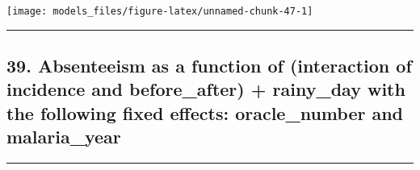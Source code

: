 \documentclass[]{article}
\begin{document}
\begin{center}\texttt{[image: models\_files/figure-latex/unnamed-chunk-47-1]} \end{center}

\newpage

\begin{center}\rule{0.5\linewidth}{\linethickness}\end{center}

\subsection{39. Absenteeism as a function of (interaction of incidence
and before\_after) + rainy\_day with the following fixed effects:
oracle\_number and
malaria\_year}\label{absenteeism-as-a-function-of-interaction-of-incidence-and-before_after-rainy_day-with-the-following-fixed-effects-oracle_number-and-malaria_year}

\begin{center}\rule{0.5\linewidth}{\linethickness}\end{center}
\end{document}
